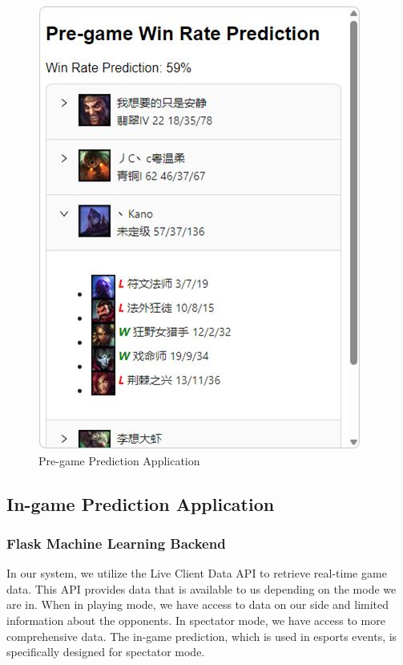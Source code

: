 \documentclass[11pt,a4paper,oneside]{report}
\begin{document}
\begin{figure}[htbp]
  \centering
  \includegraphics[height=0.4\textheight]{assets/pre_game_pred.jpg}
  \caption{Pre-game Prediction Application}
  \label{fig:pre_game_pred}
\end{figure}

\subsection{In-game Prediction Application}
\label{sec:in-game_prediction_application}
\subsubsection{Flask Machine Learning Backend}

In our system, we utilize the Live Client Data API to retrieve real-time game data. This API provides data that is available to us depending on the mode we are in. When in playing mode, we have access to data on our side and limited information about the opponents. In spectator mode, we have access to more comprehensive data. The in-game prediction, which is used in esports events, is specifically designed for spectator mode.
\end{document}
